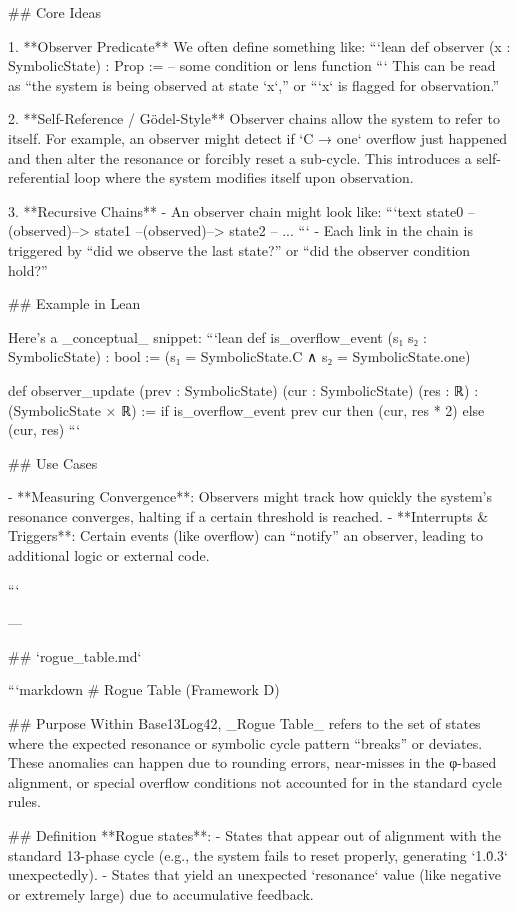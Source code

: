 ## Core Ideas

1. **Observer Predicate**  
   We often define something like:
   ```lean
   def observer (x : SymbolicState) : Prop :=
     -- some condition or lens function
   ```
   This can be read as “the system is being observed at state `x`,” or “`x` is flagged for observation.”

2. **Self-Reference / Gödel-Style**  
   Observer chains allow the system to refer to itself. For example, an observer might detect if `C → one` overflow just happened and then alter the resonance or forcibly reset a sub-cycle. This introduces a self-referential loop where the system modifies itself upon observation.

3. **Recursive Chains**  
   - An observer chain might look like:
     ```text
     state0 --(observed)--> state1 --(observed)--> state2 -- ...
     ```
   - Each link in the chain is triggered by “did we observe the last state?” or “did the observer condition hold?”

## Example in Lean

Here’s a _conceptual_ snippet:
```lean
def is_overflow_event (s₁ s₂ : SymbolicState) : bool :=
  (s₁ = SymbolicState.C ∧ s₂ = SymbolicState.one)

def observer_update (prev : SymbolicState) (cur : SymbolicState) (res : ℝ) : (SymbolicState × ℝ) :=
  if is_overflow_event prev cur then (cur, res * 2)
  else (cur, res)
```

## Use Cases

- **Measuring Convergence**: Observers might track how quickly the system’s resonance converges, halting if a certain threshold is reached.
- **Interrupts & Triggers**: Certain events (like overflow) can “notify” an observer, leading to additional logic or external code.

```

---

## `rogue_table.md`

```markdown
# Rogue Table (Framework D)

## Purpose
Within Base13Log42, _Rogue Table_ refers to the set of states where the expected resonance or symbolic cycle pattern “breaks” or deviates. These anomalies can happen due to rounding errors, near-misses in the φ-based alignment, or special overflow conditions not accounted for in the standard cycle rules.

## Definition
**Rogue states**:
- States that appear out of alignment with the standard 13-phase cycle (e.g., the system fails to reset properly, generating `1.0̇.3` unexpectedly).
- States that yield an unexpected `resonance` value (like negative or extremely large) due to accumulative feedback.

